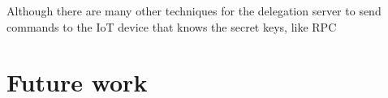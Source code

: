 
Although there are many other techniques for the delegation server to send commands to the IoT device that knows the secret keys, like RPC


\section{Future work}









